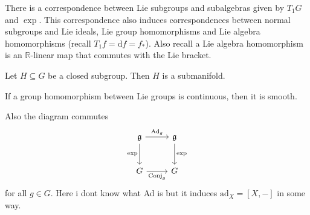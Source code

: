 
There is a correspondence between Lie subgroups and subalgebras given by $T_1G$ and $\exp $. This correspondence also induces correspondences between normal subgroups and Lie ideals, Lie group homomorphisms and Lie algebra homomorphisms (recall $T_1f=\mathrm{d} f = f_*$). Also recall a Lie algebra homomorphism is an $\mathbb{R} $-linear map that commutes with the Lie bracket.

\begin{theorem}\label{1.2.10}
	Let $H\subseteq G$ be a closed subgroup. Then $H$ is a submanifold.
\end{theorem}

\begin{theorem}\label{1.2.11}
	If a group homomorphism between Lie groups is continuous, then it is smooth.
\end{theorem}

Also the diagram commutes
\[\begin{tikzcd}[row sep = 2.5em, column sep = 2.5em]
\mathfrak{g} \ar[" \mathrm{Ad} _g ", r] \ar[" \exp  "', d]  & \mathfrak{g} \ar[" \exp  ", d]  \\
G \ar[" \operatorname{Conj} _g "', r]  & G
\end{tikzcd}\]
for all $g\in G$. Here i dont know what Ad is but it induces $\mathrm{ad} _X = [X,-]$ in some way.

